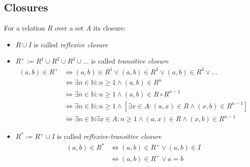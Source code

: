 \subsection{Closures}
For a relation $R$ over a set $A$ its closure:
\begin{itemize}
\item
$R \cup I$
is called \textit{reflexive closure}

\item
$R^{+} := R^{1} \cup R^{2} \cup R^{3} \cup ...$
is called \textit{transitive closure}
\begin{align}
(a,b) \in R^{+} 
&\Leftrightarrow 
(a,b) \in R^{1} \vee (a,b) \in R^{2} \vee (a,b) \in R^{3} \vee ...
\\&\Leftrightarrow 
\exists n \in \mathbb{N} : n \geq 1 \wedge (a,b) \in R^{n}
\\&\Leftrightarrow 
\exists n \in \mathbb{N} : n \geq 1 \wedge (a,b) \in R \circ R^{n-1}
\\&\Leftrightarrow 
\exists n \in \mathbb{N} : n \geq 1 \wedge [\exists x \in A : (a,x) \in R \wedge (x,b) \in R^{n-1} ]
\\&\Leftrightarrow 
\exists n \in \mathbb{N} \exists x \in A : n \geq 1 \wedge (a,x) \in R \wedge (x,b) \in R^{n-1}
\end{align}

\item
$R^{*} := R^{+} \cup I$
is called \textit{reflexive-transitive closure}
\begin{align}
(a,b) \in R^{*}
&\Leftrightarrow 
(a,b) \in R^{+} \vee (a,b) \in I
\\&\Leftrightarrow 
(a,b) \in R^{+} \vee a = b
\end{align}
\end{itemize}
